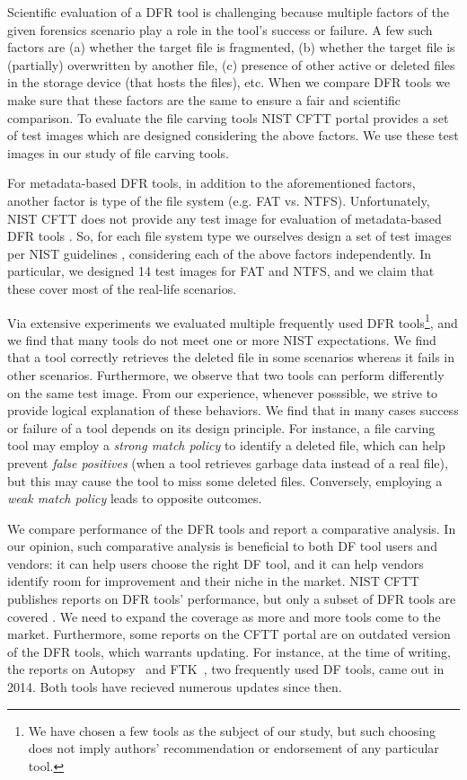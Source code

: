 Scientific evaluation of a DFR tool is challenging because multiple factors of the given forensics scenario play a role in the tool's success or failure.
A few such factors are (a) whether the target file is fragmented, (b) whether the target file is (partially) overwritten by another file, 
(c) presence of other active or deleted files in the storage device (that hosts the files), etc.
When we compare DFR tools we make sure that these factors are the same to ensure a fair and scientific comparison.
To evaluate the file carving tools NIST CFTT portal provides a set of test images which are designed considering the above factors.
We use these test images in our study of file carving tools. 

For metadata-based DFR tools, in addition to the aforementioned factors, another factor is type of the file system (e.g. FAT vs. NTFS). 
Unfortunately, NIST CFTT does not provide any test image for evaluation of metadata-based DFR tools \cite{meta:dfr:standards}.
So, for each file system type we ourselves design a set of test images per NIST guidelines \cite{meta:dfr:standards}, considering each of the above factors independently.
In particular, we designed 14 test images for FAT and NTFS, and we claim that these cover most of the real-life scenarios.


Via extensive experiments we evaluated multiple frequently used DFR tools\footnote{We have chosen a few tools as the subject of our study, 
but such choosing does not imply authors' recommendation or endorsement of any particular tool.}, and we find that many tools do not meet one or more NIST expectations.
We find that a tool correctly retrieves the deleted file in some scenarios whereas it fails in other scenarios. Furthermore, we observe that 
two tools can perform differently on the same test image. From our experience, whenever posssible, 
we strive to provide logical explanation of these behaviors. We find that in many cases 
success or failure of a tool depends on its design principle. 
For instance, a file carving tool may employ a \emph{strong match policy} to identify a deleted file, which can help prevent \emph{false positives} (when a tool retrieves garbage data instead of a real file),
but this may cause the tool to miss some deleted files. Conversely, employing a \emph{weak match policy} leads to opposite outcomes. 
 
We compare performance of the DFR tools and report a comparative analysis. In our opinion, such comparative analysis is beneficial to both DF tool 
users and vendors: it can help users choose the right DF tool, and it can help vendors identify room for improvement and their niche in the market. 
NIST CFTT publishes reports on DFR tools' performance, but only a subset of DFR tools are covered \morecite. 
We need to expand the coverage as more and more tools come to the market.
Furthermore, some reports on the CFTT portal are on outdated version of the DFR tools, which warrants updating. 
For instance, at the time of writing, the reports on Autopsy~\cite{dhs:autopsy} and FTK~\cite{dhs:ftk}, two frequently used DF tools, came out in 2014. 
Both tools have recieved numerous updates since then.   

